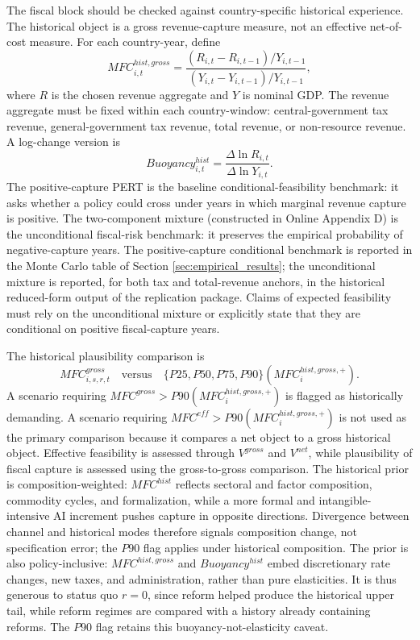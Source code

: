 \documentclass[11pt,a4paper]{article}
\begin{document}
The fiscal block should be checked against country-specific historical experience. The historical object is a gross revenue-capture measure, not an effective net-of-cost measure. For each country-year, define
\begin{equation}\label{eq:mfc_hist_gross_v10}
    MFC^{hist,gross}_{i,t}
    =\frac{(R_{i,t}-R_{i,t-1})/Y_{i,t-1}}{(Y_{i,t}-Y_{i,t-1})/Y_{i,t-1}},
\end{equation}
where $R$ is the chosen revenue aggregate and $Y$ is nominal GDP. The revenue aggregate must be fixed within each country-window: central-government tax revenue, general-government tax revenue, total revenue, or non-resource revenue. A log-change version is
\begin{equation}\label{eq:buoyancy_hist_v10}
    Buoyancy^{hist}_{i,t}=\frac{\Delta\ln R_{i,t}}{\Delta\ln Y_{i,t}}.
\end{equation}
The positive-capture PERT is the baseline conditional-feasibility benchmark: it asks whether a policy could cross under years in which marginal revenue capture is positive. The two-component mixture (constructed in Online Appendix D) is the unconditional fiscal-risk benchmark: it preserves the empirical probability of negative-capture years. The positive-capture conditional benchmark is reported in the Monte Carlo table of Section \ref{sec:empirical_results}; the unconditional mixture is reported, for both tax and total-revenue anchors, in the historical reduced-form output of the replication package. Claims of expected feasibility must rely on the unconditional mixture or explicitly state that they are conditional on positive fiscal-capture years.

The historical plausibility comparison is
\begin{equation}\label{eq:historical_comparison_v10}
    MFC^{gross}_{i,s,r,t}\quad \text{versus}\quad
    \{P25,P50,P75,P90\}(MFC^{hist,gross,+}_i).
\end{equation}
A scenario requiring $MFC^{gross}>P90(MFC^{hist,gross,+}_i)$ is flagged as historically demanding. A scenario requiring $MFC^{eff}>P90(MFC^{hist,gross,+}_i)$ is not used as the primary comparison because it compares a net object to a gross historical object. Effective feasibility is assessed through $V^{gross}$ and $V^{net}$, while plausibility of fiscal capture is assessed using the gross-to-gross comparison.
The historical prior is composition-weighted: $MFC^{hist}$ reflects sectoral and factor composition, commodity cycles, and formalization, while a more formal and intangible-intensive AI increment pushes capture in opposite directions. Divergence between channel and historical modes therefore signals composition change, not specification error; the $P90$ flag applies under historical composition. The prior is also policy-inclusive: $MFC^{hist,gross}$ and $Buoyancy^{hist}$ embed discretionary rate changes, new taxes, and administration, rather than pure elasticities. It is thus generous to status quo $r=0$, since reform helped produce the historical upper tail, while reform regimes are compared with a history already containing reforms. The $P90$ flag retains this buoyancy-not-elasticity caveat.
\end{document}
